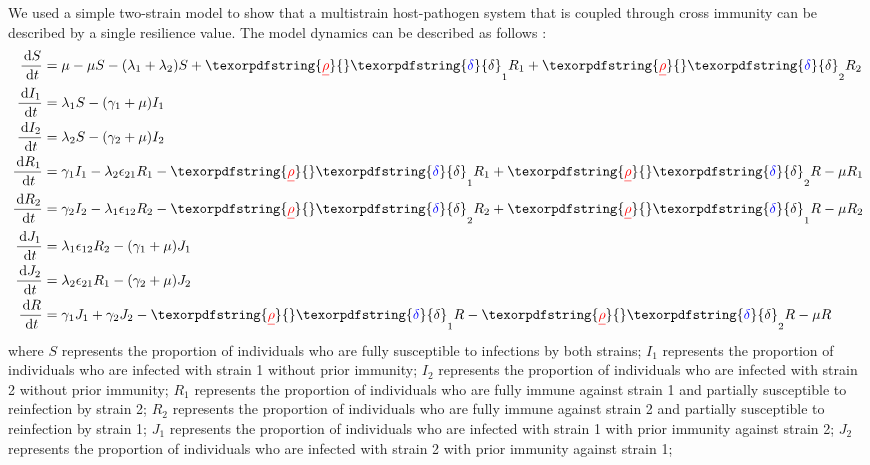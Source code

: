 \documentclass[12pt]{article}
\newcommand{\dd}[1]{\ensuremath{\, \mathrm{d}#1}}
\providecommand{\DIFaddtex}[1]{{\protect\color{blue}\uwave{#1}}} %
\providecommand{\DIFdeltex}[1]{{\protect\color{red}\sout{#1}}}                      %
\providecommand{\DIFaddbegin}{} %
\providecommand{\DIFaddend}{} %
\providecommand{\DIFdelbegin}{} %
\providecommand{\DIFdelend}{} %
\providecommand{\DIFadd}[1]{\texorpdfstring{\DIFaddtex{#1}}{#1}} %
\providecommand{\DIFdel}[1]{\texorpdfstring{\DIFdeltex{#1}}{}} %
\newcommand{\DIFscaledelfig}{0.5}
\newlength{\DIFdelgraphicswidth} %
\newlength{\DIFdelgraphicsheight} %
\newcommand{\DIFaddincludegraphics}[2][]{{\color{blue}\fbox{\DIFOincludegraphics[#1]{#2}}}} %
\newcommand{\DIFdelincludegraphics}[2][]{%
\sbox{\DIFdelgraphicsbox}{\DIFOincludegraphics[#1]{#2}}%
\settoboxwidth{\DIFdelgraphicswidth}{\DIFdelgraphicsbox} %
\settoboxtotalheight{\DIFdelgraphicsheight}{\DIFdelgraphicsbox} %
\scalebox{\DIFscaledelfig}{%
\parbox[b]{\DIFdelgraphicswidth}{\usebox{\DIFdelgraphicsbox}\\[-\baselineskip] \rule{\DIFdelgraphicswidth}{0em}}\llap{\resizebox{\DIFdelgraphicswidth}{\DIFdelgraphicsheight}{%
\setlength{\unitlength}{\DIFdelgraphicswidth}%
\begin{picture}(1,1)%
\thicklines\linethickness{2pt} %
{\color[rgb]{1,0,0}\put(0,0){\framebox(1,1){}}}%
{\color[rgb]{1,0,0}\put(0,0){\line( 1,1){1}}}%
{\color[rgb]{1,0,0}\put(0,1){\line(1,-1){1}}}%
\end{picture}%
}\hspace*{3pt}}} %
} %
\DeclareRobustCommand{\DIFaddbegin}{\DIFOaddbegin \let\includegraphics\DIFaddincludegraphics} %
\DeclareRobustCommand{\DIFaddend}{\DIFOaddend \let\includegraphics\DIFOincludegraphics} %
\DeclareRobustCommand{\DIFdelbegin}{\DIFOdelbegin \let\includegraphics\DIFdelincludegraphics} %
\DeclareRobustCommand{\DIFdelend}{\DIFOaddend \let\includegraphics\DIFOincludegraphics} %
\begin{document}
We used a simple two-strain model to show that a multistrain host-pathogen system that is coupled through cross immunity can be described by a single resilience value.
The model dynamics can be described as follows \citep{bhattacharyya2015cross}: 
\begin{align}
\frac{\dd S}{\dd t} &= \mu - \mu S - (\lambda_1 + \lambda_2) S + \DIFdelbegin \DIFdel{\rho}\DIFdelend \DIFaddbegin \DIFadd{\delta}\DIFaddend _1 R_1 + \DIFdelbegin \DIFdel{\rho}\DIFdelend \DIFaddbegin \DIFadd{\delta}\DIFaddend _2 R_2 \\
\frac{\dd I_1}{\dd t} &= \lambda_1 S - (\gamma_1 + \mu) I_1 \\
\frac{\dd I_2}{\dd t} &= \lambda_2 S - (\gamma_2 + \mu) I_2 \\
\frac{\dd R_1}{\dd t} &= \gamma_1 I_1 - \lambda_2 \epsilon_{21} R_1 - \DIFdelbegin \DIFdel{\rho}\DIFdelend \DIFaddbegin \DIFadd{\delta}\DIFaddend _1 R_1 + \DIFdelbegin \DIFdel{\rho}\DIFdelend \DIFaddbegin \DIFadd{\delta}\DIFaddend _2 R - \mu R_1\\
\frac{\dd R_2}{\dd t} &= \gamma_2 I_2 - \lambda_1 \epsilon_{12} R_2 - \DIFdelbegin \DIFdel{\rho}\DIFdelend \DIFaddbegin \DIFadd{\delta}\DIFaddend _2 R_2 + \DIFdelbegin \DIFdel{\rho}\DIFdelend \DIFaddbegin \DIFadd{\delta}\DIFaddend _1 R - \mu R_2\\
\frac{\dd J_1}{\dd t} &= \lambda_1 \epsilon_{12} R_2 - (\gamma_1 + \mu) J_1\\
\frac{\dd J_2}{\dd t} &= \lambda_2 \epsilon_{21} R_1 - (\gamma_2 + \mu) J_2\\
\frac{\dd R}{\dd t} &= \gamma_1 J_1 + \gamma_2 J_2 - \DIFdelbegin \DIFdel{\rho}\DIFdelend \DIFaddbegin \DIFadd{\delta}\DIFaddend _1 R - \DIFdelbegin \DIFdel{\rho}\DIFdelend \DIFaddbegin \DIFadd{\delta}\DIFaddend _2 R - \mu R
\end{align}
where $S$ represents the proportion of individuals who are fully susceptible to infections by both strains;
$I_1$ represents the proportion of individuals who are infected with strain 1 without prior immunity;
$I_2$ represents the proportion of individuals who are infected with strain 2 without prior immunity;
$R_1$ represents the proportion of individuals who are fully immune against strain 1 and partially susceptible to reinfection by strain 2;
$R_2$ represents the proportion of individuals who are fully immune against strain 2 and partially susceptible to reinfection by strain 1;
$J_1$ represents the proportion of individuals who are infected with strain 1 with prior immunity against strain 2;
$J_2$ represents the proportion of individuals who are infected with strain 2 with prior immunity against strain 1;
\end{document}
